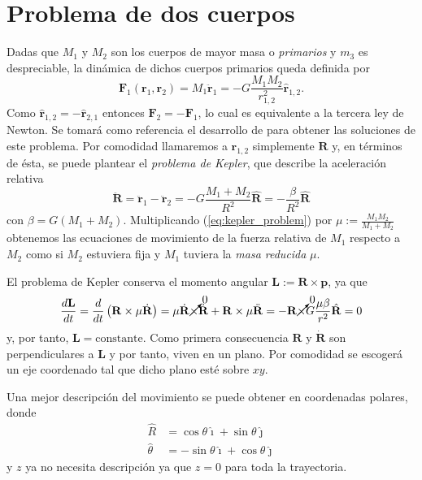 \section{Problema de dos cuerpos}
\label{sec:2body_problem}
Dadas que $M_1$ y $M_2$ son los cuerpos de mayor masa o \textit{primarios} y $m_3$ es despreciable, la dinámica de dichos cuerpos primarios queda definida por
\begin{equation}
 \mathbf{F}_1(\mathbf{r}_1,\mathbf{r}_2) = M_1 \ddot{\mathbf{r}}_1 = -G \frac{M_1 M_2}{r_{1,2}^2} \hat{\mathbf{r}}_{1,2}.
 \label{eq:2body_eqs_motion}
\end{equation}
Como $\hat{\mathbf{r}}_{1,2} = - \hat{\mathbf{r}}_{2,1}$ entonces $\mathbf{F}_2 = -\mathbf{F}_1$, lo cual es equivalente a la tercera ley de Newton. Se tomará como referencia el desarrollo de \cite{} para obtener las soluciones de este problema. Por comodidad llamaremos a $\mathbf{r}_{1,2}$ simplemente $\mathbf{R}$ y, en términos de ésta, se puede plantear el \textit{problema de Kepler}, que describe la aceleración relativa
\begin{equation}
 \ddot{\mathbf{R}} = \ddot{\mathbf{r}}_1 - \ddot{\mathbf{r}}_2 = -G \frac{M_1 + M_2}{R^2} \hat{\mathbf{R}} = - \frac{\beta}{R^2}\hat{\mathbf{R}}
 \label{eq:kepler_problem}
\end{equation}
con $\beta = G \left(M_1 + M_2 \right)$. Multiplicando (\ref{eq:kepler_problem}) por $\mu := \frac{M_1 M_2}{M_1+M_2}$ obtenemos las ecuaciones de movimiento de la fuerza relativa de $M_1$ respecto a $M_2$ como si $M_2$ estuviera fija y $M_1$ tuviera la \textit{masa reducida} $\mu$.

El problema de Kepler conserva el momento angular $\mathbf{L} := \mathbf{R} \times \mathbf{p}$, ya que
\begin{equation}
 \frac{d\mathbf{L}}{dt} = \frac{d}{dt}\left(\mathbf{R} \times \mu\dot{\mathbf{R}} \right) = \mu\dot{\mathbf{R}} \cancelto{0}{\times}\dot{\mathbf{R}} + \mathbf{R} \times \mu \ddot{\mathbf{R}} = - \mathbf{R} \cancelto{0}{\times} G\frac{\mu \beta}{r^2}\hat{\mathbf{R}} = 0
\end{equation}
y, por tanto, $\mathbf{L} = \text{constante}$. Como primera consecuencia $\mathbf{R}$ y $\dot{\mathbf{R}}$ son perpendiculares a $\mathbf{L}$ y por tanto, viven en un plano. Por comodidad se escogerá un eje coordenado tal que dicho plano esté sobre $xy$. 

Una mejor descripción del movimiento se puede obtener en coordenadas polares, donde
\begin{align}
 \hat{R} &= \cos \theta \hat{\imath} + \sin \theta \hat{\jmath} \nonumber \\
 \hat{\theta} &= -\sin \theta \hat{\imath} + \cos \theta \hat{\jmath}
 \label{eq:polar_transformation}
\end{align}
y $z$ ya no necesita descripción ya que $z=0$ para toda la trayectoria. 

